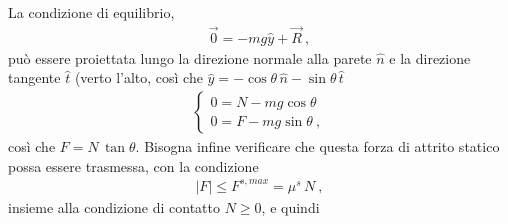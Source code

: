 \documentclass[letterpaper,10pt,italian]{jupyterBook}
\begin{document}
\sphinxAtStartPar
La condizione di equilibrio,
\begin{equation*}
\begin{split}\vec{0} = -m g \hat{y} + \vec{R}\ ,\end{split}
\end{equation*}
\sphinxAtStartPar
può essere proiettata lungo la direzione normale alla parete \(\hat{n}\) e la direzione tangente \(\hat{t}\) (verto l’alto, così che \(\hat{y} = - \cos \theta \, \hat{n} - \sin \theta \, \hat{t}\)
\begin{equation*}
\begin{split}\begin{cases}
0 = N - m g \cos \theta \\
0 = F - m g \sin \theta \ ,
\end{cases}\end{split}
\end{equation*}
\sphinxAtStartPar
così che \(F = N \, \tan \theta\). Bisogna infine verificare che questa forza di attrito statico possa essere trasmessa, con la condizione
\begin{equation*}
\begin{split}|F| \le F^{s,max} = \mu^s \, N \ ,\end{split}
\end{equation*}
\sphinxAtStartPar
insieme alla condizione di contatto \(N \ge 0\), e quindi
\end{document}
